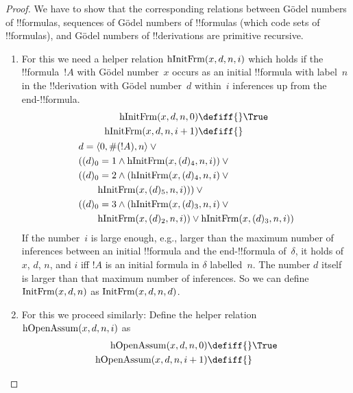 \documentclass[../../../include/open-logic-section]{subfiles}
\begin{document}
\begin{proof}
We have to show that the corresponding relations between G\"odel
numbers of !!{formula}s, sequences of G\"odel numbers of !!{formula}s
(which code sets of !!{formula}s), and G\"odel numbers of !!{derivation}s 
are primitive recursive.
\begin{enumerate}
\item For this we need a helper relation $\mathrm{hInitFrm}(x, d, n, i)$
  which holds if the !!{formula}~$!A$ with G\"odel number~$x$ occurs
  as an initial !!{formula} with label~$n$ in the !!{derivation} with
  G\"odel number~$d$ within~$i$ inferences up from the
  end-!!{formula}.
  \begin{multline*}
    \begin{aligned}
    \fn{hInitFrm}(x, d, n, 0) \defiff {} & \True\\   
    \fn{hInitFrm}(x, d, n, i+1) \defiff {} &
    \end{aligned}\\
    \begin{aligned}
&  d = \tuple{0, \Gn{!A}, n} \lor {}\\
      & ((d)_0 = 1 \land \fn{hInitFrm}(x, (d)_4, n, i)) \lor {}\\
      & ((d)_0 = 2 \land (\fn{hInitFrm}(x, (d)_4, n, i) \lor {}\\
      & \qquad\fn{hInitFrm}(x, (d)_5, n, i))) \lor {}\\
      & ((d)_0 = 3 \land (\fn{hInitFrm}(x, (d)_3, n, i) \lor {}\\
      & \qquad \fn{hInitFrm}(x, (d)_2, n, i)) \lor
      \fn{hInitFrm}(x, (d)_3, n, i))
\end{aligned}
  \end{multline*}
   If the number~$i$ is large enough, e.g., larger than the maximum
   number of inferences between an initial !!{formula} and the
   end-!!{formula} of~$\delta$, it holds of $x$, $d$, $n$, and $i$ iff
   $!A$ is an initial formula in $\delta$ labelled~$n$.  The number
   $d$ itself is larger than that maximum number of inferences.  So we
   can define $\mathrm{InitFrm}(x, d, n)$ as $\mathrm{InitFrm}(x,
   d, n, d)$.
\item For this we proceed similarly: Define the helper relation
  $\mathrm{hOpenAssum}(x, d, n, i)$ as
  \begin{multline*}
    \begin{aligned}
    \fn{hOpenAssum}(x, d, n, 0) \defiff {} & \True\\   
    \fn{hOpenAssum}(x, d, n, i+1) \defiff {} &
    \end{aligned}\\

\end{multline*}
\end{enumerate}
\end{proof}
\end{document}
